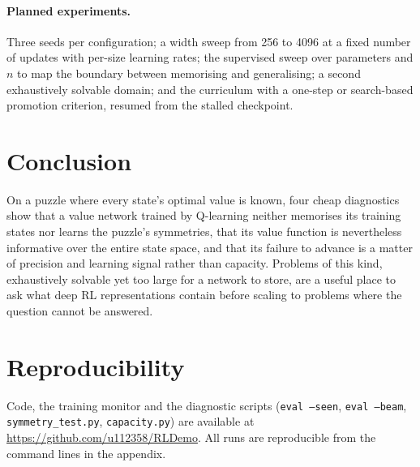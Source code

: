 \documentclass[11pt]{article}
\begin{document}
\paragraph{Planned experiments.}
Three seeds per configuration; a width sweep from 256 to 4096 at a fixed number of updates with
per-size learning rates; the supervised sweep over parameters and $n$ to map the boundary
between memorising and generalising; a second exhaustively solvable domain; and the curriculum
with a one-step or search-based promotion criterion, resumed from the stalled checkpoint.

\section{Conclusion}

On a puzzle where every state's optimal value is known, four cheap diagnostics show that a
value network trained by Q-learning neither memorises its training states nor learns the
puzzle's symmetries, that its value function is nevertheless informative over the entire state
space, and that its failure to advance is a matter of precision and learning signal rather than
capacity. Problems of this kind, exhaustively solvable yet too large for a network to store, are
a useful place to ask what deep RL representations contain before scaling to problems where the
question cannot be answered.

\section*{Reproducibility}
Code, the training monitor and the diagnostic scripts (\texttt{eval --seen}, \texttt{eval
--beam}, \texttt{symmetry\_test.py}, \texttt{capacity.py}) are available at
\url{https://github.com/u112358/RLDemo}. All runs are reproducible from the command lines in the appendix.
\end{document}
